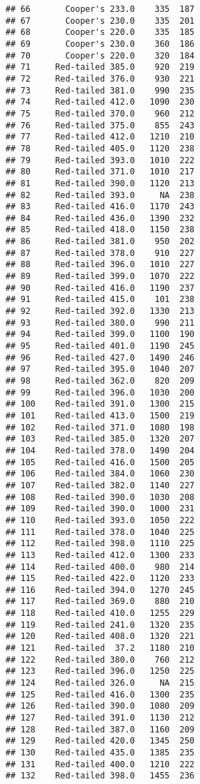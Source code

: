 \documentclass[
]{article}
\begin{document}
\begin{verbatim}
## 66       Cooper's 233.0    335  187
## 67       Cooper's 230.0    335  201
## 68       Cooper's 220.0    335  185
## 69       Cooper's 230.0    360  186
## 70       Cooper's 220.0    320  184
## 71     Red-tailed 385.0    920  219
## 72     Red-tailed 376.0    930  221
## 73     Red-tailed 381.0    990  235
## 74     Red-tailed 412.0   1090  230
## 75     Red-tailed 370.0    960  212
## 76     Red-tailed 375.0    855  243
## 77     Red-tailed 412.0   1210  210
## 78     Red-tailed 405.0   1120  238
## 79     Red-tailed 393.0   1010  222
## 80     Red-tailed 371.0   1010  217
## 81     Red-tailed 390.0   1120  213
## 82     Red-tailed 393.0     NA  238
## 83     Red-tailed 416.0   1170  243
## 84     Red-tailed 436.0   1390  232
## 85     Red-tailed 418.0   1150  238
## 86     Red-tailed 381.0    950  202
## 87     Red-tailed 378.0    910  227
## 88     Red-tailed 396.0   1010  227
## 89     Red-tailed 399.0   1070  222
## 90     Red-tailed 416.0   1190  237
## 91     Red-tailed 415.0    101  238
## 92     Red-tailed 392.0   1330  213
## 93     Red-tailed 380.0    990  211
## 94     Red-tailed 399.0   1100  190
## 95     Red-tailed 401.0   1190  245
## 96     Red-tailed 427.0   1490  246
## 97     Red-tailed 395.0   1040  207
## 98     Red-tailed 362.0    820  209
## 99     Red-tailed 396.0   1030  200
## 100    Red-tailed 391.0   1300  215
## 101    Red-tailed 413.0   1500  219
## 102    Red-tailed 371.0   1080  198
## 103    Red-tailed 385.0   1320  207
## 104    Red-tailed 378.0   1490  204
## 105    Red-tailed 416.0   1500  205
## 106    Red-tailed 384.0   1060  230
## 107    Red-tailed 382.0   1140  227
## 108    Red-tailed 390.0   1030  208
## 109    Red-tailed 390.0   1000  231
## 110    Red-tailed 393.0   1050  222
## 111    Red-tailed 378.0   1040  225
## 112    Red-tailed 398.0   1110  225
## 113    Red-tailed 412.0   1300  233
## 114    Red-tailed 400.0    980  214
## 115    Red-tailed 422.0   1120  233
## 116    Red-tailed 394.0   1270  245
## 117    Red-tailed 369.0    880  210
## 118    Red-tailed 410.0   1255  229
## 119    Red-tailed 241.0   1320  235
## 120    Red-tailed 408.0   1320  221
## 121    Red-tailed  37.2   1180  210
## 122    Red-tailed 380.0    760  212
## 123    Red-tailed 396.0   1250  225
## 124    Red-tailed 326.0     NA  215
## 125    Red-tailed 416.0   1300  235
## 126    Red-tailed 390.0   1080  209
## 127    Red-tailed 391.0   1130  212
## 128    Red-tailed 387.0   1160  209
## 129    Red-tailed 420.0   1345  250
## 130    Red-tailed 435.0   1385  235
## 131    Red-tailed 400.0   1210  222
## 132    Red-tailed 398.0   1455  236

\end{verbatim}
\end{document}
